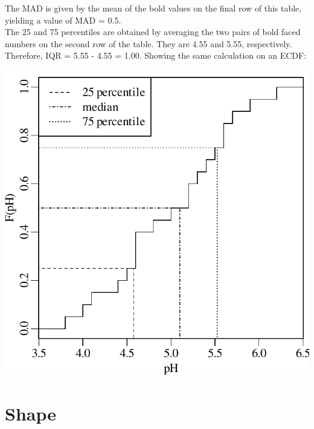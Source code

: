 The MAD is given by the mean of the bold values on the final row of
this table, yielding a value of MAD = 0.5.\\

The 25 and 75 percentiles are obtained by averaging the two pairs of
bold faced numbers on the second row of the table. They are 4.55 and
5.55, respectively. Therefore, IQR = 5.55 - 4.55 = 1.00. Showing the
same calculation on an ECDF:

\noindent\begin{minipage}[t][][b]{.4\textwidth}
\includegraphics[width=\textwidth]{../figures/IQRpH.pdf}
\end{minipage}
\begin{minipage}[t][][t]{.6\textwidth}
\end{minipage}

\section{Shape}
\label{sec:shape}

